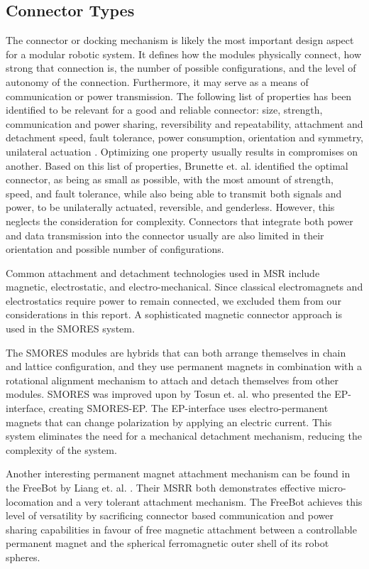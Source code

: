 \documentclass[letterpaper, 10 pt, conference]{ieeeconf}  %
\begin{document}
\subsection{Connector Types}
The connector or docking mechanism is likely the most important design aspect for a modular robotic system. It defines how the modules physically connect, how strong that connection is, the number of possible configurations, and the level of autonomy of the connection. Furthermore, it may serve as a means of communication or power transmission. The following list of properties has been identified to be relevant for a good and reliable connector: size, strength, communication and power sharing, reversibility and repeatability, attachment and detachment speed, fault tolerance, power consumption, orientation and symmetry, unilateral actuation \cite{Nilsson, Rus2002, Sprowitz2014a}. Optimizing one property usually results in compromises on another. Based on this list of properties, Brunette et. al. identified the optimal connector, as being as small as possible, with the most amount of strength, speed, and fault tolerance, while also being able to transmit both signals and power, to be unilaterally actuated, reversible, and genderless\cite{Brunete2017}. However, this neglects the consideration for complexity. Connectors that integrate both power and data transmission into the connector usually are also limited in their orientation and possible number of configurations.

Common attachment and detachment technologies used in MSR include magnetic, electrostatic, and electro-mechanical. Since classical electromagnets and electrostatics require power to remain connected, we excluded them from our considerations in this report. A sophisticated magnetic connector approach is used in the SMORES system.

The SMORES modules are hybrids that can both arrange themselves in chain and lattice configuration, and they use permanent magnets in combination with a rotational alignment mechanism to attach and detach themselves from other modules\cite{Davey2012}. SMORES was improved upon by Tosun et. al. who presented the EP-interface, creating SMORES-EP\cite{Tosun2016}. The EP-interface uses electro-permanent magnets that can change polarization by applying an electric current. This system eliminates the need for a mechanical detachment mechanism, reducing the complexity of the system.

Another interesting permanent magnet attachment mechanism can be found in the FreeBot by Liang et. al. \cite{Liang2020}. Their MSRR both demonstrates effective micro-locomation and a very tolerant attachment mechanism. The FreeBot achieves this level of versatility by sacrificing connector based communication and power sharing capabilities in favour of free magnetic attachment between a controllable permanent magnet and the spherical ferromagnetic outer shell of its robot spheres.
\end{document}

